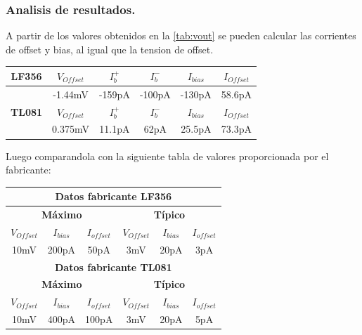 \documentclass[a4paper]{article}
\begin{document}
\subsubsection{Analisis de resultados.}
A partir de los valores obtenidos en la   \ref{tab:vout} se pueden calcular las corrientes de offset y bias, al igual que la tension de offset.
\begin{table}[H]
\begin{center}
\begin{tabular}{|c|c|c|c|c|c|}
\hline
\textbf{LF356} & \textbf{$V_{Offset}$} & \textbf{$I_b^+$} & \textbf{$I_b^-$} & \textbf{$I_{bias}$} & \textbf{$I_{Offset}$} \\ \hline
               & -1.44mV                & -159pA           & -100pA           & -130pA               & 58.6pA                 \\ \hline
\textbf{TL081} & \textbf{$V_{Offset}$} & \textbf{$I_b^+$} & \textbf{$I_b^-$} & \textbf{$I_{bias}$} & \textbf{$I_{Offset}$} \\ \hline
\textbf{}      & 0.375mV                & 11.1pA           & 62pA             & 25.5pA               & 73.3pA                 \\ \hline
\end{tabular}
\end{center}
\end{table}
Luego comparandola con la siguiente tabla de valores proporcionada por el fabricante:
\begin{table}[H]
\begin{center}
\begin{tabular}{|c|c|c|c|c|c|}
\hline
\multicolumn{6}{|c|}{\textbf{Datos fabricante LF356}}                                                                                     \\ \hline
\multicolumn{3}{|c|}{\textbf{Máximo}}                               & \multicolumn{3}{c|}{\textbf{Típico}}                                \\ \hline
\textbf{$V_{Offset}$} & \textbf{$I_{bias}$} & \textbf{$I_{offset}$} & \textbf{$V_{Offset}$} & \textbf{$I_{bias}$} & \textbf{$I_{offset}$} \\ \hline
10mV                  & 200pA               & 50pA                  & 3mV                   & 20pA                & 3pA                   \\ \hline
\multicolumn{6}{|c|}{\textbf{Datos fabricante TL081}}                                                                                     \\ \hline
\multicolumn{3}{|c|}{\textbf{Máximo}}                               & \multicolumn{3}{c|}{\textbf{Típico}}                                \\ \hline
\textbf{$V_{Offset}$} & \textbf{$I_{bias}$} & \textbf{$I_{offset}$} & \textbf{$V_{Offset}$} & \textbf{$I_{bias}$} & \textbf{$I_{offset}$} \\ \hline
10mV                  & 400pA               & 100pA                 & 3mV                   & 20pA                & 5pA                   \\ \hline
\end{tabular}
\end{center}
\end{table}
\end{document}
